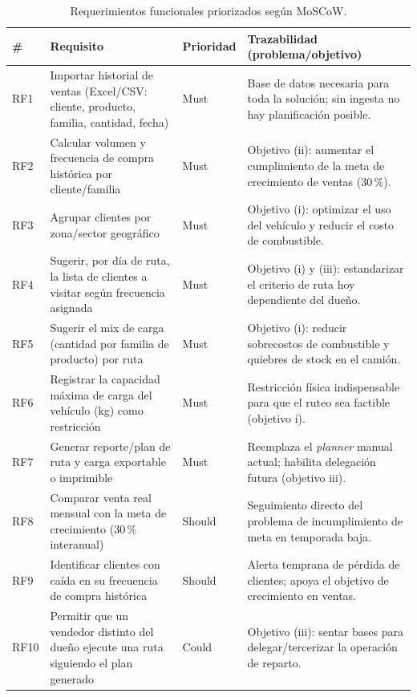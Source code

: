 \documentclass[10pt,a4paper]{article}
\begin{document}
\begin{table}[H]
\centering
\small
\begin{tabular}{p{0.7cm} p{6.2cm} p{1.6cm} p{6.2cm}}
\toprule
\textbf{\#} & \textbf{Requisito} & \textbf{Prioridad} & \textbf{Trazabilidad (problema/objetivo)} \\
\midrule
RF1 & Importar historial de ventas (Excel/CSV: cliente, producto, familia, cantidad, fecha) & Must & Base de datos necesaria para toda la solución; sin ingesta no hay planificación posible. \\
RF2 & Calcular volumen y frecuencia de compra histórica por cliente/familia & Must & Objetivo (ii): aumentar el cumplimiento de la meta de crecimiento de ventas (30\,\%). \\
RF3 & Agrupar clientes por zona/sector geográfico & Must & Objetivo (i): optimizar el uso del vehículo y reducir el costo de combustible. \\
RF4 & Sugerir, por día de ruta, la lista de clientes a visitar según frecuencia asignada & Must & Objetivo (i) y (iii): estandarizar el criterio de ruta hoy dependiente del dueño. \\
RF5 & Sugerir el mix de carga (cantidad por familia de producto) por ruta & Must & Objetivo (i): reducir sobrecostos de combustible y quiebres de stock en el camión. \\
RF6 & Registrar la capacidad máxima de carga del vehículo (kg) como restricción & Must & Restricción física indispensable para que el ruteo sea factible (objetivo i). \\
RF7 & Generar reporte/plan de ruta y carga exportable o imprimible & Must & Reemplaza el \textit{planner} manual actual; habilita delegación futura (objetivo iii). \\
RF8 & Comparar venta real mensual con la meta de crecimiento (30\,\% interanual) & Should & Seguimiento directo del problema de incumplimiento de meta en temporada baja. \\
RF9 & Identificar clientes con caída en su frecuencia de compra histórica & Should & Alerta temprana de pérdida de clientes; apoya el objetivo de crecimiento en ventas. \\
RF10 & Permitir que un vendedor distinto del dueño ejecute una ruta siguiendo el plan generado & Could & Objetivo (iii): sentar bases para delegar/tercerizar la operación de reparto. \\
\bottomrule
\end{tabular}
\caption{Requerimientos funcionales priorizados según MoSCoW.}
\label{tab:rf-moscow}
\end{table}
\end{document}
